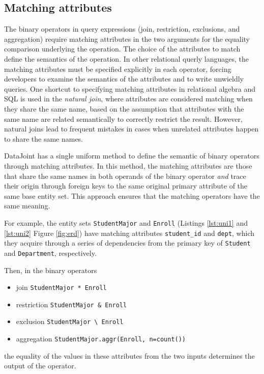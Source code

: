 \documentclass[letter,10pt]{article}
\newcommand{\datajoint}{DataJoint\xspace}
\begin{document}
\subsection{Matching attributes}\label{sec:match}
The binary operators in query expressions (join, restriction,  exclusions, and aggregation) require matching attributes in the two arguments for the equality comparison underlying the operation. 
The choice of the attributes to match define the semantics of the operation. 
In other relational querly languages, the matching attributes must be specified explicitly in each operator, forcing developers to examine the semantics of the attributes and to write unwieldly queries.
One shortcut to specifying matching attributes in relational algebra and SQL is used in the \emph{natural join}, where attributes are considered matching when they share the same name, based on the assumption that attributes with the same name are related semantically to correctly restrict the result.
However, natural joins lead to frequent mistakes in cases when unrelated attributes happen to share the same names.

\datajoint has a single uniform method to define the semantic of binary operators through matching attributes.  
In this method, the matching attributes are those that share the same names in both operands of the binary operator \emph{and} trace their origin through foreign keys to the same original primary attribute of the same base entity set.
This approach ensures that the matching operators have the same meaning. 

For example, the entity sets \lstinline$StudentMajor$ and \lstinline$Enroll$ (Listings \ref{lst:uni1} and \ref{lst:uni2} Figure \ref{fig:erd}) have matching attributes \lstinline$student_id$ and \lstinline$dept$, which they acquire through a series of dependencies from the primary key of \lstinline$Student$ and \lstinline$Department$, respectively.  

Then, in the binary operators 
\begin{itemize}
\item join \lstinline$StudentMajor * Enroll$ 
\item restriction \lstinline$StudentMajor & Enroll$ 
\item exclusion \lstinline$StudentMajor \ Enroll$ 
\item aggregation \lstinline$StudentMajor.aggr(Enroll, n=count())$ 
\end{itemize}
 the equality of the values in these attributes from the two inputs determines the output of the operator.
\end{document}
